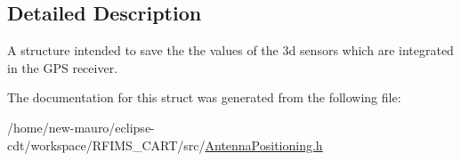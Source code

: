 \subsection{Detailed Description}
A structure intended to save the the values of the 3d sensors which are integrated in the G\+PS receiver. 

The documentation for this struct was generated from the following file\+:\begin{DoxyCompactItemize}
\item 
/home/new-\/mauro/eclipse-\/cdt/workspace/\+R\+F\+I\+M\+S\+\_\+\+C\+A\+R\+T/src/\hyperlink{AntennaPositioning_8h}{Antenna\+Positioning.\+h}\end{DoxyCompactItemize}
